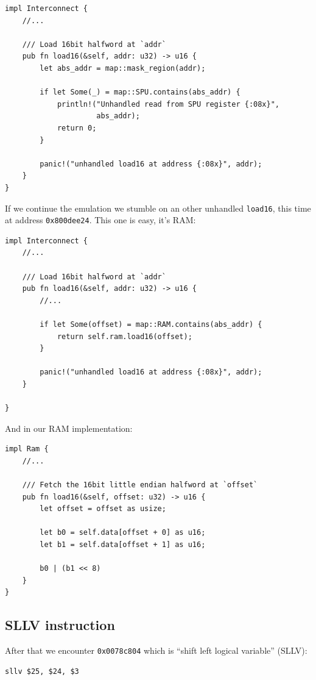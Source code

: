 \documentclass[a4paper]{article}
\newcommand{\code}[1] {\texttt{#1}}
\begin{document}
\begin{lstlisting}
impl Interconnect {
    //...

    /// Load 16bit halfword at `addr`
    pub fn load16(&self, addr: u32) -> u16 {
        let abs_addr = map::mask_region(addr);

        if let Some(_) = map::SPU.contains(abs_addr) {
            println!("Unhandled read from SPU register {:08x}",
                     abs_addr);
            return 0;
        }

        panic!("unhandled load16 at address {:08x}", addr);
    }
}
\end{lstlisting}

If we continue the emulation we stumble on an other unhandled
\code{load16}, this time at address \code{0x800dee24}. This one is
easy, it's RAM:

\begin{lstlisting}
impl Interconnect {
    //...

    /// Load 16bit halfword at `addr`
    pub fn load16(&self, addr: u32) -> u16 {
        //...

        if let Some(offset) = map::RAM.contains(abs_addr) {
            return self.ram.load16(offset);
        }

        panic!("unhandled load16 at address {:08x}", addr);
    }

}
\end{lstlisting}

And in our RAM implementation:

\begin{lstlisting}
impl Ram {
    //...

    /// Fetch the 16bit little endian halfword at `offset`
    pub fn load16(&self, offset: u32) -> u16 {
        let offset = offset as usize;

        let b0 = self.data[offset + 0] as u16;
        let b1 = self.data[offset + 1] as u16;

        b0 | (b1 << 8)
    }
}
\end{lstlisting}

\subsection{SLLV instruction}

After that we encounter \code{0x0078c804} which is ``shift left
logical variable'' (SLLV):

\begin{lstlisting}[language=assembly]
sllv $25, $24, $3
\end{lstlisting}
\end{document}
